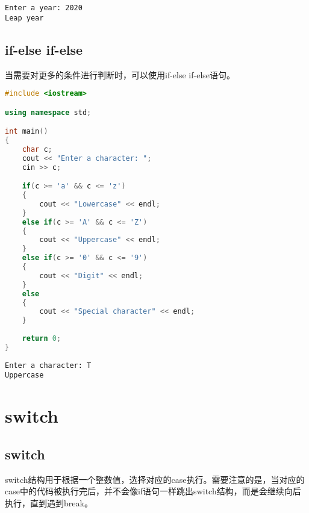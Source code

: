 \begin{tcolorbox}
	\begin{verbatim}
Enter a year: 2020
Leap year
\end{verbatim}
\end{tcolorbox}

\vspace{0.5cm}

\subsection{if-else if-else}

当需要对更多的条件进行判断时，可以使用if-else if-else语句。\\


\begin{lstlisting}[language=C++]
#include <iostream>

using namespace std;

int main()
{
	char c;
	cout << "Enter a character: ";
	cin >> c;

	if(c >= 'a' && c <= 'z')
	{
		cout << "Lowercase" << endl;
	}
	else if(c >= 'A' && c <= 'Z')
	{
		cout << "Uppercase" << endl;
	}
	else if(c >= '0' && c <= '9')
	{
		cout << "Digit" << endl;
	}
	else
	{
		cout << "Special character" << endl;
	}
	
	return 0;
}
\end{lstlisting}

\begin{tcolorbox}
	\begin{verbatim}
Enter a character: T
Uppercase
\end{verbatim}
\end{tcolorbox}

\newpage

\section{switch}

\subsection{switch}

switch结构用于根据一个整数值，选择对应的case执行。需要注意的是，当对应的case中的代码被执行完后，并不会像if语句一样跳出switch结构，而是会继续向后执行，直到遇到break。\\


